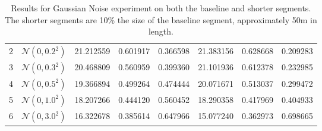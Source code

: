 \begin{table}[ht]
\begin{tabular}{l l | C{2.2} C{1.3} C{1.3} | C{2.2} C{1.3} C{1.3}}
2 & $\mathcal{N}(0, 0.2^2)$ & 21.212559 & 0.601917 & 0.366598 & 21.383156 & 0.628668 & 0.209283 \\
3 & $\mathcal{N}(0, 0.3^2)$ & 20.468809 & 0.560959 & 0.399360 & 21.101936 & 0.612378 & 0.232985 \\
4 & $\mathcal{N}(0, 0.5^2)$ & 19.366894 & 0.499264 & 0.474444 & 20.071671 & 0.513037 & 0.299472 \\
5 & $\mathcal{N}(0, 1.0^2)$ & 18.207266 & 0.444120 & 0.560452 & 18.290358 & 0.417969 & 0.404933 \\
6 & $\mathcal{N}(0, 3.0^2)$ &  16.322678 &  0.385614 &  0.647966 &  15.077240 &  0.362973 &  0.698665 \\
\hline
\end{tabular}
\caption{Results for Gaussian Noise experiment on both the baseline and shorter segments. The shorter segments are 10\% the size of the baseline segment, approximately 50m in length.}
\label{tab:exp-gaussian-noise}
\end{table}

